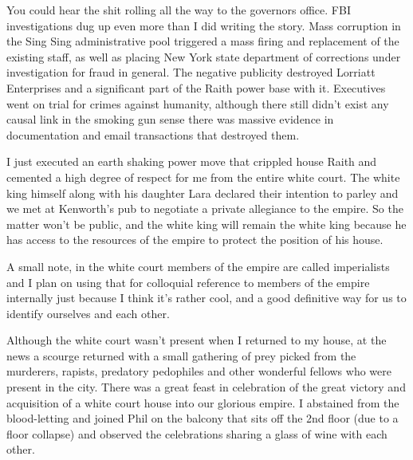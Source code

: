 You could hear the shit rolling all the way to the governors office. FBI investigations dug up even more than I did writing the story. Mass corruption in the Sing Sing administrative pool triggered a mass firing and replacement of the existing staff, as well as placing New York state department of corrections under investigation for fraud in general. The negative publicity destroyed Lorriatt Enterprises and a significant part of the Raith power base with it. Executives went on trial for crimes against humanity, although there still didn't exist any causal link in the smoking gun sense there was massive evidence in documentation and email transactions that destroyed them.

I just executed an earth shaking power move that crippled house Raith and cemented a high degree of respect for me from the entire white court. The white king himself along with his daughter Lara declared their intention to parley and we met at Kenworth's pub to negotiate a private allegiance to the empire. So the matter won't be public, and the white king will remain the white king because he has access to the resources of the empire to protect the position of his house.

A small note, in the white court members of the empire are called imperialists and I plan on using that for colloquial reference to members of the empire internally just because I think it's rather cool, and a good definitive way for us to identify ourselves and each other.

Although the white court wasn't present when I returned to my house, at the news a scourge returned with a small gathering of prey picked from the murderers, rapists, predatory pedophiles and other wonderful fellows who were present in the city. There was a great feast in celebration of the great victory and acquisition of a white court house into our glorious empire. I abstained from the blood-letting and joined Phil on the balcony that sits off the 2nd floor (due to a floor collapse) and observed the celebrations sharing a glass of wine with each other.








 